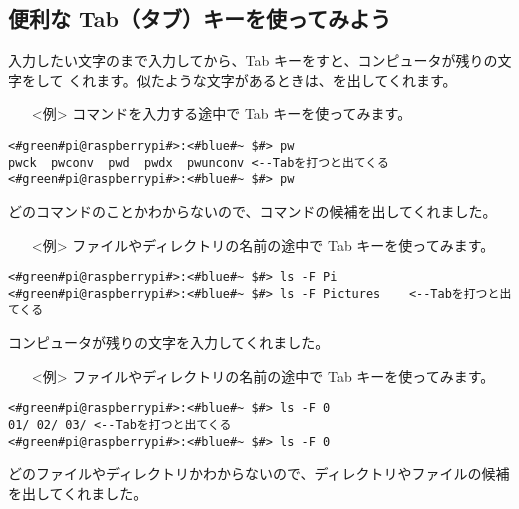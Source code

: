 \subsection{便利な Tab（タブ）キーを使ってみよう}
入力したい文字のまで入力してから、Tab キーをすと、コンピュータが残りの文字をして
くれます。似たような文字があるときは、を出してくれます。
\begin{itemize}
\item[<例>]コマンドを入力する途中で Tab キーを使ってみます。
\end{itemize}
\begin{lstlisting}[caption=Tabの例1, label=Tab1]
<#green#pi@raspberrypi#>:<#blue#~ $#> pw
pwck  pwconv  pwd  pwdx  pwunconv <--Tabを打つと出てくる
<#green#pi@raspberrypi#>:<#blue#~ $#> pw
\end{lstlisting}
どのコマンドのことかわからないので、コマンドの候補を出してくれました。
\begin{itemize}
\item[<例>]ファイルやディレクトリの名前の途中で Tab キーを使ってみます。
\end{itemize}
\begin{lstlisting}[caption=Tabの例2, label=Tab2]
<#green#pi@raspberrypi#>:<#blue#~ $#> ls -F Pi
<#green#pi@raspberrypi#>:<#blue#~ $#> ls -F Pictures	<--Tabを打つと出てくる
\end{lstlisting}
コンピュータが残りの文字を入力してくれました。
\begin{itemize}
\item[<例>]ファイルやディレクトリの名前の途中で Tab キーを使ってみます。
\end{itemize}
\begin{lstlisting}[caption=Tabの例3, label=Tab3]
<#green#pi@raspberrypi#>:<#blue#~ $#> ls -F 0
01/	02/	03/	<--Tabを打つと出てくる
<#green#pi@raspberrypi#>:<#blue#~ $#> ls -F 0
\end{lstlisting}
どのファイルやディレクトリかわからないので、ディレクトリやファイルの候補を出してくれました。

\begin{figure}[h]
\begin{tcolorbox}[title=\useOmetoi]
\begin{enumerate}
\end{enumerate}
\end{tcolorbox}
\end{figure}
